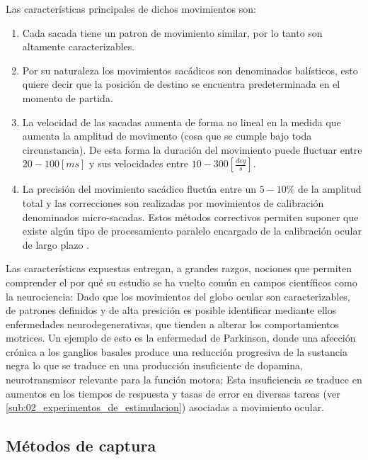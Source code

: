 \documentclass[../main.tex]{subfiles}
\begin{document}
		Las características principales de dichos movimientos son:
		\begin{enumerate}
			\item Cada sacada tiene un patron de movimiento similar, por lo tanto son altamente caracterizables.

			\item Por su naturaleza los movimientos sacádicos son denominados balísticos, esto quiere decir que la posición de destino se encuentra predeterminada en el momento de partida. 

			\item La velocidad de las sacadas aumenta de forma no lineal en la medida que aumenta la amplitud de movimento (cosa que se cumple bajo toda circunstancia). De esta forma la duración del movimiento puede fluctuar entre $20 - 100[ms]$ y sus velocidades entre $10 - 300 [\frac{deg}{s}]$.

			\item La precisión del movimiento sacádico fluctúa entre un $5-10\%$ de la amplitud total y las correcciones son realizadas por movimientos de calibración denominados micro-sacadas. Estos métodos correctivos permiten suponer que existe algún tipo de procesamiento paralelo encargado de la calibración ocular de largo plazo \cite{website:movOcular}.  

		\end{enumerate}

		Las características expuestas entregan, a grandes razgos, nociones que permiten comprender el por qué su estudio se ha vuelto común en campos científicos como la neurociencia: Dado que los movimientos del globo ocular son caracterizables, de patrones definidos y de alta presición es posible identificar mediante ellos enfermedades neurodegenerativas, que tienden a alterar los comportamientos motrices. Un ejemplo de esto es la enfermedad de Parkinson, donde una afección crónica a los ganglios basales produce una reducción progresiva de la sustancia negra lo que se traduce en una producción insuficiente de dopamina, neurotransmisor relevante para la función motora; Esta insuficiencia se traduce en aumentos en los tiempos de respuesta y tasas de error en diversas tareas (ver \ref{sub:02_experimentos_de_estimulacion}) asociadas a movimiento ocular.    

		\subsection{Métodos de captura}
		\label{sub:02_metodos_de_captura}
\end{document}
